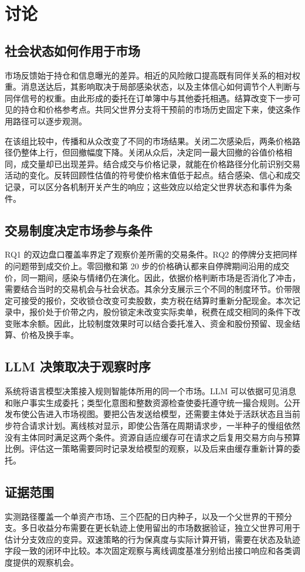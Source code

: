 \section{讨论}
\label{sec:discussion_zh}

\subsection{社会状态如何作用于市场}

市场反馈始于持仓和信息曝光的差异。相近的风险敞口提高既有同伴关系的相对权重。消息送达后，其影响取决于局部感染状态，以及主体信心如何调节个人判断与同伴信号的权重。由此形成的委托在订单簿中与其他委托相遇。结算改变下一步可见的持仓和价格参考点。共同父世界分支将干预前的市场历史固定下来，使这条作用路径可以逐步观测。

在该组比较中，传播和从众改变了不同的市场结果。关闭二次感染后，两条价格路径仍整体上行，但回撤幅度下降。关闭从众后，决定同一最大回撤的谷值价格相同，成交量却已出现差异。结合成交与价格记录，就能在价格路径分化前识别交易活动的变化。反转回顾性估值的符号使价格末值低于起点。结合感染、信心和成交记录，可以区分各机制开关产生的响应；这些效应以给定父世界状态和事件为条件。

\subsection{交易制度决定市场参与条件}

RQ1 的双边盘口覆盖率界定了观察价差所需的交易条件。RQ2 的停牌分支把同样的问题带到成交价上。零回撤和第 20 步的价格确认都来自停牌期间沿用的成交价，同一期间，感染与情绪仍在演化。因此，依据价格判断市场是否消化了冲击，需要结合当时的交易机会与社会状态。其余分支展示三个不同的制度环节。价带限定可接受的报价，交收锁仓改变可卖股数，卖方税在结算时重新分配现金。本次记录中，报价处于价带之内，股份锁定未改变实际卖单，税费在成交相同的条件下改变账本余额。因此，比较制度效果时可以结合委托准入、资金和股份预留、现金结算、价格及换手率。

\subsection{LLM 决策取决于观察时序}

系统将语言模型决策接入规则智能体所用的同一个市场。LLM 可以依据可见消息和账户事实生成委托；类型化意图和整数资源检查使委托遵守统一撮合规则。公开发布使公告进入市场视图。要把公告发送给模型，还需要主体处于活跃状态且当前步符合请求计划。离线核对显示，即使公告落在周期请求步，一半种子的慢组依然没有主体同时满足这两个条件。资源自适应缓存可在请求之后复用交易方向与预算比例。评估这一策略需要同时记录发给模型的观察，以及后来由缓存重新计算的委托。

\subsection{证据范围}

实测路径覆盖一个单资产市场、三个匹配的日内种子，以及一个父世界的干预分支。多日收益分布需要在更长轨迹上使用留出的市场数据验证，独立父世界可用于估计分支效应的变异。双速策略的行为保真度与实际计算开销，需要在状态及轨迹字段一致的闭环中比较。本次固定观察与离线调度基准分别给出接口响应和各类调度提供的观察机会。

